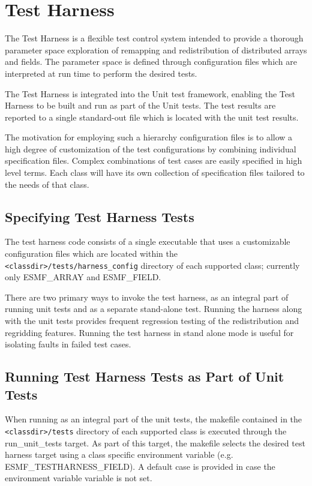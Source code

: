 \section{Test Harness}
\label{sec:harness}


The Test Harness is a flexible test control system intended to provide a thorough 
parameter space exploration of remapping and redistribution of distributed arrays and fields.
The parameter space is defined through configuration files which are interpreted at
run time to perform the desired tests.

The Test Harness is integrated into the Unit test framework, enabling
the Test Harness to be built and run as part of the Unit tests. The test results 
are reported to a single standard-out file which is located with the unit test 
results.

The motivation for employing such a hierarchy configuration files is to allow a 
high degree of customization of the test configurations by combining individual 
specification files. Complex combinations of test cases are easily specified in high level terms.
Each class will have its own collection of specification files tailored to the needs of that class.

\subsection{Specifying Test Harness Tests}
The test harness code consists of a single executable that uses a customizable configuration
files which are located within the \texttt{<classdir>/tests/harness\_config} directory of each 
supported class; currently only ESMF\_ARRAY and ESMF\_FIELD.

There are two primary ways to invoke the test harness, as an integral part of running unit
tests and as a separate stand-alone test.  Running the harness along with the unit tests provides
frequent regression testing of the redistribution and regridding features.  Running the test harness
in stand alone mode is useful for isolating faults in failed test cases.

\subsection{Running Test Harness Tests as Part of Unit Tests}
When running as an integral part of the unit tests, the makefile contained in the
\texttt{<classdir>/tests} directory of each supported class is executed through the run\_unit\_tests target.
As part of this target, the makefile selects the desired test harness target using a class
specific environment variable (e.g. ESMF\_TESTHARNESS\_FIELD).  A default case is provided in
case the environment variable variable is not set.

